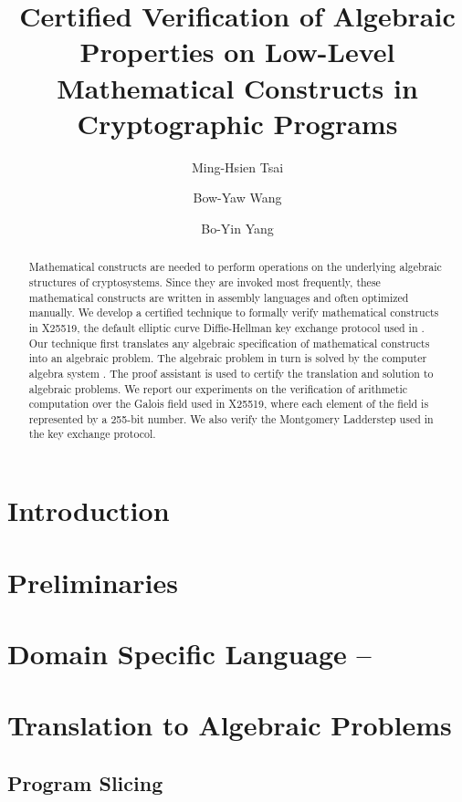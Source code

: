 \documentclass{llncs}
\title{Certified Verification of Algebraic Properties on
Low-Level Mathematical Constructs in Cryptographic Programs}
\author{
Ming-Hsien Tsai
\and
Bow-Yaw Wang
\and
Bo-Yin Yang
%
}
\institute
{
Institute of Information Science\\
Academia Sinica\\
128 Section 2 Academia Road, Taipei 115-29, Taiwan\\
\email{mhtsai208@gmail.com, bywang@iis.sinica.edu.tw, by@crypto.tw}
}
\author{\vspace*{0cm}}
\institute{\vspace*{0cm}\ }
\begin{document}
\maketitle

\begin{abstract}
  Mathematical constructs are needed to perform operations
  on the underlying algebraic structures of cryptosystems. 
  Since they are invoked most frequently, these mathematical constructs
  are written in assembly languages and often optimized manually. We
  develop a certified technique to formally verify mathematical
  constructs in X25519, the default elliptic curve Diffie-Hellman key
  exchange protocol used in \openssh. Our technique first translates any
  algebraic specification of mathematical constructs into an algebraic
  problem. The algebraic 
  problem in turn is solved by the computer algebra system \singular. 
  The proof assistant 
  \coq is used to certify the translation and solution to algebraic
  problems. We report our experiments on the verification of
  arithmetic computation over the Galois field used in X25519, where
  each element of the field is represented by a 255-bit number. We
  also verify the Montgomery Ladderstep used in the key exchange
  protocol.
\end{abstract}

\section{Introduction}
\label{section:introduction}


\section{Preliminaries}
\label{section:preliminaries}


\section{Domain Specific Language -- \mydsl}
\label{section:domain-specific-language}


\section{Translation to Algebraic Problems}
\label{section:translation}


\subsection{Program Slicing}
\label{subsection:translation:slicing}

\end{document}

